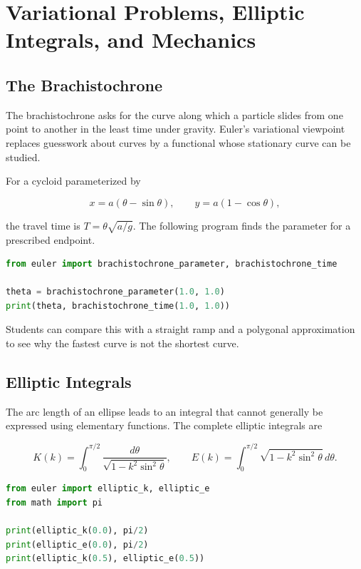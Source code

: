 \chapter{Variational Problems, Elliptic Integrals, and Mechanics}
\label{ch:discovery_variation_mechanics}

\section{The Brachistochrone}

The brachistochrone asks for the curve along which a particle slides from one point
to another in the least time under gravity. Euler's variational viewpoint replaces
guesswork about curves by a functional whose stationary curve can be studied.

For a cycloid parameterized by

\[
x=a(\theta-\sin\theta),\qquad y=a(1-\cos\theta),
\]

the travel time is $T=\theta\sqrt{a/g}$. The following program finds the parameter
for a prescribed endpoint.

\begin{lstlisting}[language=Python]
from euler import brachistochrone_parameter, brachistochrone_time

theta = brachistochrone_parameter(1.0, 1.0)
print(theta, brachistochrone_time(1.0, 1.0))
\end{lstlisting}

Students can compare this with a straight ramp and a polygonal approximation to see
why the fastest curve is not the shortest curve.

\section{Elliptic Integrals}

The arc length of an ellipse leads to an integral that cannot generally be expressed
using elementary functions. The complete elliptic integrals are

\[
K(k)=\int_0^{\pi/2}\frac{d\theta}{\sqrt{1-k^2\sin^2\theta}},
\qquad
E(k)=\int_0^{\pi/2}\sqrt{1-k^2\sin^2\theta}\,d\theta.
\]

\begin{lstlisting}[language=Python]
from euler import elliptic_k, elliptic_e
from math import pi

print(elliptic_k(0.0), pi/2)
print(elliptic_e(0.0), pi/2)
print(elliptic_k(0.5), elliptic_e(0.5))
\end{lstlisting}

